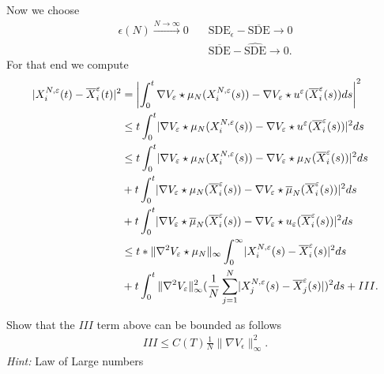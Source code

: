 Now we choose 
\begin{align*}
  \epsilon(N) \xrightarrow{N\to \infty} 0   \quad &\text{SDE}_\epsilon - \overline{\text{SDE}} \to 0 \\ 
                                                  &\overline{\text{SDE}} - \widehat{\text{SDE}} \to 0
.\end{align*}
For that end we compute 
\begin{align*}
  \abs{X_i^{N,\epsilon}(t) - \overline{X}_i^{\epsilon}(t)   }^2 &=  \abs*{\int_0^{t} \nabla V_\epsilon \star  \mu_N(X_{i}^{N,\epsilon}(s) ) - \nabla V_{\epsilon} \star  u^{\epsilon}(\overline{X}_i^{\epsilon}(s)  )  ds }^2\\
                                                                &\le t \int_0^{t} \abs{\nabla V_\epsilon \star  \mu_N(X_{i}^{N,\epsilon}(s) ) - \nabla V_{\epsilon} \star  u^{\epsilon}(\overline{X}_i^{\epsilon}(s)  ) }^2 ds \\
                                                                &\le t \int_0^{t} \abs{\nabla V_{\epsilon} \star  \mu_N(X_i^{N,\epsilon}(s))-\nabla V_{\epsilon} \star \mu_N(\overline{X}_i^{\epsilon}(s)  )  }^2 ds\\
                                                                &+ t \int_0^{t} \abs{\nabla V_\epsilon \star  \mu_N(\overline{X}_i^{\epsilon}(s)) - \nabla V_{\epsilon} \star  \overline{\mu }_N(\overline{X}_i^{\epsilon}(s)  ) }^2 ds \\
                                                                &+ t \int_0^{t} \abs{\nabla V_\epsilon \star  \overline{\mu}_N(\overline{X}_i^{\epsilon}(s)) - \nabla V_{\epsilon} \star  u_{\epsilon}(\overline{X}_i^{\epsilon}(s)   ) }^2 ds \\
                                                                &\le t* \|\nabla^2 V_\epsilon \star  \mu_N\|_{\infty}  \int_0^{\infty}  \abs{X_i^{N,\epsilon}(s)-\overline{X}_i^{\epsilon}(s)   }^2 ds\\
                                                                &+ t \int_0^{t} \|\nabla ^2 V_\epsilon\|^2_{\infty} (\frac{1}{N} \sum_{j=1}^{N} \abs{X_j^{N,\epsilon}(s) - \overline{X}^{\epsilon}_j(s)   })^2 ds + III
.\end{align*}
\begin{exercise}
 Show that the $III$ term above can be bounded as follows
 \begin{align*}
  III \le  C(T)\frac{1}{N}\|\nabla V_\epsilon\|_{\infty}^2
 .\end{align*}
\textit{Hint:} Law of Large numbers
\end{exercise}
